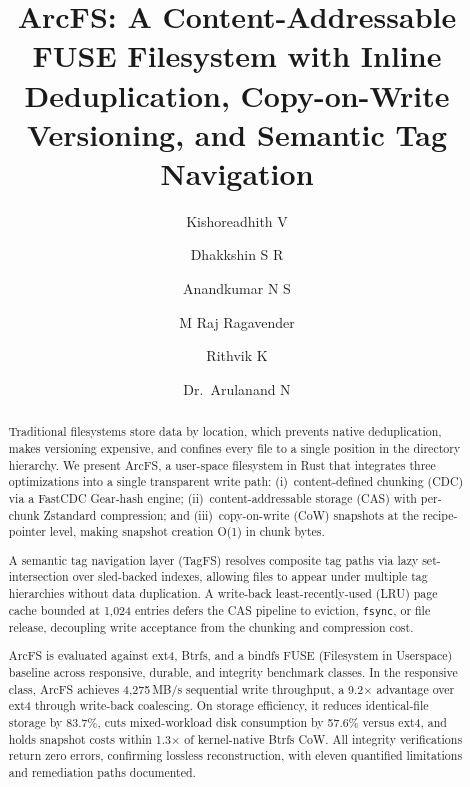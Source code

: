 \documentclass[5p,times]{elsarticle}
\begin{document}
\begin{frontmatter}

\title{ArcFS: A Content-Addressable FUSE Filesystem with Inline
Deduplication, Copy-on-Write Versioning, and Semantic Tag Navigation}

\author[psg]{Kishoreadhith V}
\author[psg]{Dhakkshin S R}
\author[psg]{Anandkumar N S}
\author[psg]{M Raj Ragavender}
\author[psg]{Rithvik K}
\author[psg]{Dr.\ Arulanand N}


\address[psg]{Department of Computer Science and Engineering,
PSG College of Technology, Coimbatore, India -- 641\,004}

\begin{abstract}
Traditional filesystems store data by location, which prevents native
deduplication, makes versioning expensive, and confines every file to a
single position in the directory hierarchy. We present ArcFS, a
user-space filesystem in Rust that integrates three optimizations into
a single transparent write path:
(i)~content-defined chunking (CDC) via a FastCDC Gear-hash engine;
(ii)~content-addressable storage (CAS) with per-chunk Zstandard
compression; and
(iii)~copy-on-write (CoW) snapshots at the recipe-pointer level, making
snapshot creation O(1) in chunk bytes.

A semantic tag navigation layer (TagFS) resolves composite tag paths
via lazy set-intersection over sled-backed indexes, allowing files to
appear under multiple tag hierarchies without data duplication.
A write-back least-recently-used (LRU) page cache bounded at 1,024
entries defers the CAS pipeline to eviction, \texttt{fsync}, or file
release, decoupling write acceptance from the chunking and compression
cost.

ArcFS is evaluated against ext4, Btrfs, and a bindfs
FUSE (Filesystem in Userspace) baseline across responsive, durable,
and integrity benchmark classes. In the responsive class, ArcFS
achieves 4,275\,MB/s sequential write throughput, a 9.2$\times$
advantage over ext4 through write-back coalescing. On storage
efficiency, it reduces identical-file storage by 83.7\%, cuts
mixed-workload disk consumption by 57.6\% versus ext4, and holds
snapshot costs within 1.3$\times$ of kernel-native Btrfs CoW. All
integrity verifications return zero errors, confirming lossless
reconstruction, with eleven quantified limitations and remediation
paths documented.
\end{abstract}


\end{frontmatter}
\end{document}

